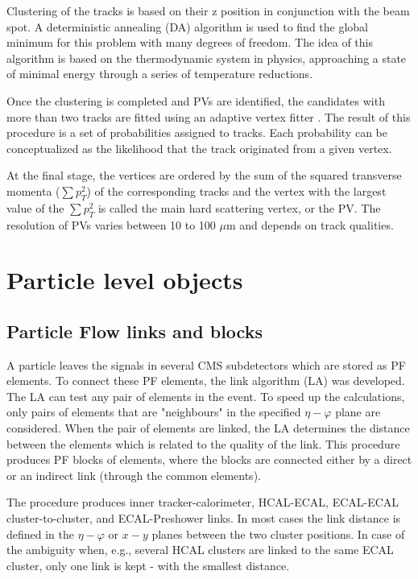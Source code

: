 Clustering of the tracks is based on their z position in conjunction with the beam spot. A deterministic annealing (DA) algorithm \cite{DeterministicAnnealing} is used to find the global minimum for this problem with many degrees of freedom. The idea of this algorithm is based on the thermodynamic system in physics, approaching a state of minimal energy through a series of temperature reductions. 

Once the clustering is completed and PVs are identified, the candidates with more than two tracks are fitted using an adaptive vertex fitter \cite{AdaptiveVertexFitting}. The result of this procedure is a set of probabilities assigned to tracks. Each probability can be conceptualized as the likelihood that the track originated from a given vertex.

At the final stage, the vertices are ordered by the sum of the squared transverse momenta ($\sum p_T^2$) of the corresponding tracks and the vertex with the largest value of the $\sum p_T^2$ is called the main hard scattering vertex, or the PV. The resolution of PVs varies between 10 to 100 $\mu$m and depends on track qualities. 

\section{Particle level objects}\label{sec:muons}
\subsection{Particle Flow links and blocks}\label{sec:some_reconstruction}

A particle leaves the signals in several CMS subdetectors which are stored as PF \cite{ParticleFlow} elements. To connect these PF elements, the link algorithm (LA) was developed. The LA can test any pair of elements in the event. To speed up the calculations, only pairs of elements that are "neighbours" in the specified $\eta - \varphi$ plane are considered. When the pair of elements are linked, the LA determines the distance between the elements which is related to the quality of the link. This procedure produces PF blocks of elements, where the blocks are connected either by a direct or an indirect link (through the common elements).

The procedure produces inner tracker-calorimeter, HCAL-ECAL, ECAL-ECAL  cluster-to-cluster, and ECAL-Preshower links. In most cases the link distance is defined in the $\eta-\varphi$ or $x-y$ planes between the two cluster positions. In case of the ambiguity when, e.g., several HCAL clusters are linked to the same ECAL cluster, only one link is kept - with the smallest distance. 

